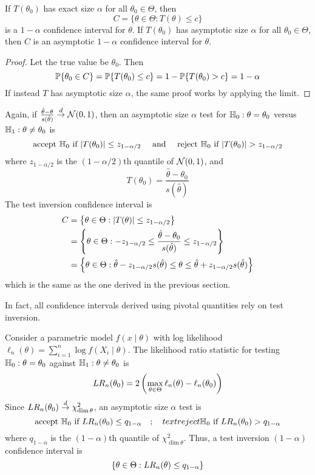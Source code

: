 \documentclass[10pt]{article}
\begin{document}
\begin{theorem}
	If $T(\theta_0)$ has exact size $\alpha$ for all $\theta_0 \in \Theta$, then
	\[
	C = \{\theta \in \Theta : T(\theta) \le c\}
	\]
	is a $1-\alpha$ confidence interval for $\theta$. If $T(\theta_0)$ has asymptotic size $\alpha$ for all $\theta_0 \in \Theta$, then $C$ is an asymptotic $1-\alpha$ confidence interval for $\theta$. 
\end{theorem}
\begin{proof}
	Let the true value be $\theta_0$. Then
	\[
	\mathbb{P}\{\theta_0 \in C\} = \mathbb{P}\{T(\theta_0) \le c\} = 1 - \mathbb{P}\{T(\theta_0) > c\} = 1-\alpha
	\]
	If instead $T$ has asymptotic size $\alpha$, the same proof works by applying the limit.
\end{proof}

\begin{example}
	Again, if $\frac{\hat{\theta} - \theta}{s(\hat{\theta})} \overset{d}{\to} \mathcal{N}(0,1)$, then an asymptotic size $\alpha$ test for $\mathbb{H}_0 : \theta = \theta_0$ versus $\mathbb{H}_1 : \theta \ne \theta_0$ is
	\[
	\text{accept } \mathbb{H}_0 \text{ if } |T(\theta_0)| \le z_{1-\alpha / 2} \quad \text{ and } \quad \text{reject } \mathbb{H}_0 \text{ if } |T(\theta_0)| > z_{1-\alpha / 2}
	\]
	where $z_{1-\alpha / 2}$ is the $(1-\alpha / 2)$th quantile of $\mathcal{N}(0,1)$, and
	\[
	T(\theta_0) = \frac{\hat{\theta} - \theta_0}{s(\hat{\theta})}
	\]
	The test inversion confidence interval is
	\begin{align*}
		C &= \left\{ \theta \in \Theta : |T(\theta)| \le z_{1-\alpha / 2}\right\} \\
		&= \left\{ \theta \in \Theta : - z_{1-\alpha / 2} \le \frac{\hat{\theta} - \theta_0}{s(\hat{\theta})} \le z_{1-\alpha / 2}\right\} \\
		&= \left\{ \theta \in \Theta : \hat{\theta} - z_{1-\alpha / 2} s(\hat{\theta}) \le \theta \le \hat{\theta} + z_{1-\alpha / 2} s(\hat{\theta}) \right\}
	\end{align*}
	which is the same as the one derived in the previous section.
\end{example}

\begin{remark}
	In fact, all confidence intervals derived using pivotal quantities rely on test inversion.
\end{remark}

\begin{example}
	Consider a parametric model $f(x \mid \theta)$ with log likelihood $\ell_n(\theta) = \sum_{i=1}^n \log f(X_i \mid \theta)$. The likelihood ratio statistic for testing $\mathbb{H}_0: \theta = \theta_0$ against $\mathbb{H}_1: \theta \ne \theta_0$ is
	\[
	LR_n(\theta_0) = 2 \left( \max_{\theta \in \Theta} \ell_n(\theta) - \ell_n(\theta_0)\right)
	\]
	Since $LR_n(\theta_0) \overset{d}{\to} \chi^2_{\dim \theta}$, an asymptotic size $\alpha$ test is
	\[
	\text{accept } \mathbb{H}_0 \text{ if } LR_n(\theta_0) \le q_{1-\alpha} \quad ; \quad text{reject } \mathbb{H}_0 \text{ if } LR_n(\theta_0) > q_{1-\alpha}
	\]
	where $q_{1-\alpha}$ is the $(1-\alpha)$th quantile of $\chi^2_{\dim \theta}$. Thus, a test inversion $(1-\alpha)$ confidence interval is
	\[
	\left\{ \theta \in \Theta : LR_n(\theta) \le q_{1-\alpha}\right\}
	\]
\end{example}
\end{document}
